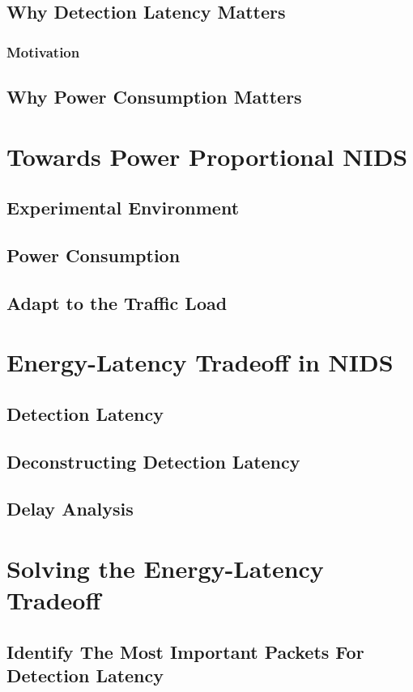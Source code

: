 \documentclass{beamer}
\begin{document}
\subsection {Why Detection Latency Matters}

\begin{frame}
  \frametitle{Motivation}    
\end{frame}

\subsection{Why Power Consumption Matters }
\section{Towards Power Proportional NIDS} 
\subsection{Experimental Environment}
\subsection{Power Consumption}
\subsection{Adapt to the Traffic Load}
\section{Energy-Latency Tradeoff in NIDS} 
\subsection{Detection Latency}
\subsection{Deconstructing Detection Latency}
\subsection{Delay Analysis}
\section{Solving the Energy-Latency Tradeoff} 
\subsection{Identify The Most Important Packets For Detection Latency}
\end{document}
